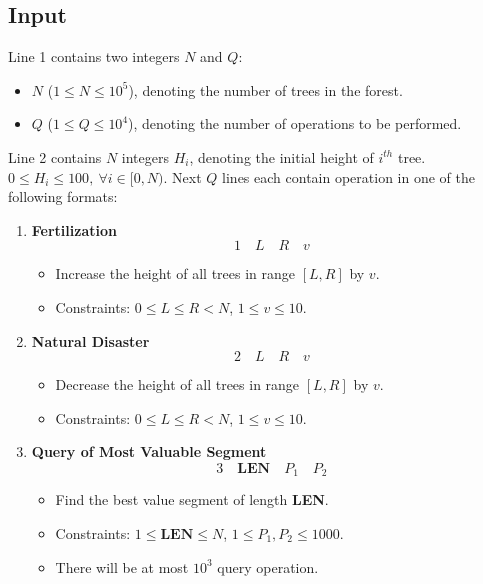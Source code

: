 \documentclass[12pt,a4paper]{article}
\begin{document}
\subsection*{\fontsize{16}{12}Input}
Line 1 contains two integers $N$ and $Q$:
\begin{itemize}
    \item \( N \) (\( 1 \leq N \leq 10^5 \)), denoting the number of trees in the forest.
    \item \( Q \) (\( 1 \leq Q \leq 10^4 \)), denoting the number of operations to be performed.
\end{itemize}
\noindent
Line 2 contains \(N\) integers $H_i$, denoting the initial height of $i^{th}$ tree. \( 0 \leq H_i \leq 100,\ \forall i \in [0,N)\).
\newpage
\noindent
Next $Q$ lines each contain operation in one of the following formats:

\begin{enumerate}
    \item \textbf{Fertilization}
    \[1 \quad L \quad R \quad v\]
        \begin{itemize}
            \item Increase the height of all trees in range \( [L, R] \) by \( v \).
            \item Constraints: \( 0 \leq L \leq R < N \), \( 1 \leq v \leq 10 \).
        \end{itemize}
    \item \textbf{Natural Disaster}
    \[2 \quad L \quad R \quad v\]
        \begin{itemize}
            \item Decrease the height of all trees in range \( [L, R] \) by \( v \).
            \item Constraints: \( 0 \leq L \leq R < N \), \( 1 \leq v \leq 10 \).
        \end{itemize}
    \item \textbf{Query of Most Valuable Segment}
    \[
    3 \quad \textbf{LEN} \quad P_1 \quad P_2
    \]
    \begin{itemize}
        \item Find the best value segment of length \textbf{LEN}.
        \item Constraints: \( 1 \leq \textbf{LEN} \leq N \), \( 1 \leq P_1,P_2 \leq 1000 \).
        \item There will be at most $10^3$ query operation.
    \end{itemize}
\end{enumerate}
\end{document}
